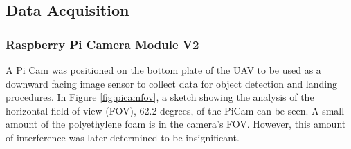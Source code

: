 \documentclass[letterpaper, 12 pt, conference]{ieeeconf}
\begin{document}
%
\subsection{Data Acquisition}
% 
\subsubsection{Raspberry Pi Camera Module V2}
% 
A Pi Cam was positioned on the bottom plate of the UAV to be used as a downward facing image sensor to collect data for object detection and landing procedures. In Figure \ref{fig:picamfov}, a sketch showing the analysis of the horizontal field of view (FOV), 62.2 degrees, of the PiCam can be seen. A small amount of the polyethylene foam is in the camera's FOV. However, this amount of interference was later determined to be insignificant.
\end{document}
